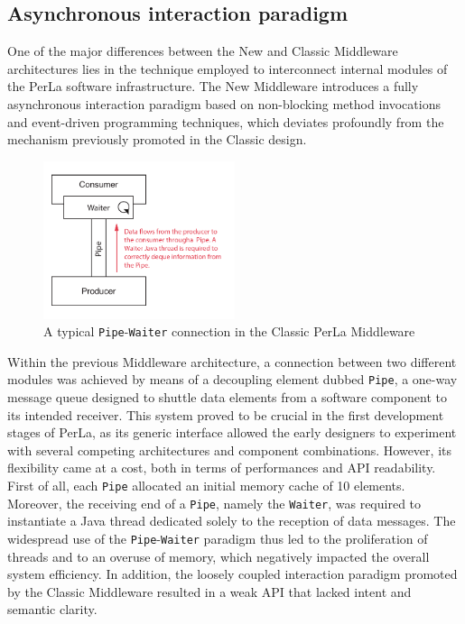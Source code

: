 \subsection{Asynchronous interaction paradigm}
\label{sec:newmiddleware.async}

One of the major differences between the New and Classic Middleware
architectures lies in the technique employed to interconnect internal modules
of the PerLa software infrastructure. The New Middleware introduces a fully
asynchronous interaction paradigm based on non-blocking method invocations and
event-driven programming techniques, which deviates profoundly from the
mechanism previously promoted in the Classic design.

\begin{figure}[h!]
    \center
    \includegraphics[width=0.5\textwidth]{imgs/pipe_waiter.pdf}
    \caption{A typical \texttt{Pipe}-\texttt{Waiter} connection in the Classic
        PerLa Middleware}
\end{figure}

Within the previous Middleware architecture, a connection between two different
modules was achieved by means of a decoupling element dubbed \texttt{Pipe}, a
one-way message queue designed to shuttle data elements from a software
component to its intended receiver. This system proved to be crucial in the
first development stages of PerLa, as its generic interface allowed the early
designers to experiment with several competing architectures and component
combinations. However, its flexibility came at a cost, both in terms of
performances and API readability. First of all, each \texttt{Pipe} allocated an
initial memory cache of 10 elements. Moreover, the receiving end of a
\texttt{Pipe}, namely the \texttt{Waiter}, was required to instantiate a Java
thread dedicated solely to the reception of data messages. The widespread use
of the \texttt{Pipe}-\texttt{Waiter} paradigm thus led to the proliferation of
threads and to an overuse of memory, which negatively impacted the overall
system efficiency. In addition, the loosely coupled interaction paradigm
promoted by the Classic Middleware resulted in a weak API that lacked intent
and semantic clarity.

